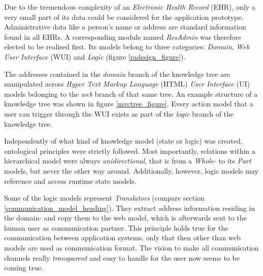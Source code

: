 Due to the tremendous complexity of an \emph{Electronic Health Record} (EHR),
only a very small part of its data could be considered for the application
prototype. Administrative data like a person's name or address are standard
information found in all EHRs. A corresponding module named \emph{ResAdmin}
\cite{holzmueller2005} was therefore elected to be realised first. Its models
belong to three categories: \emph{Domain}, \emph{Web User Interface} (WUI) and
\emph{Logic} (figure \ref{radesign_figure}).

The addresses contained in the \emph{domain} branch of the knowledge tree are
manipulated across \emph{Hyper Text Markup Language} (HTML) \emph{User Interface}
(UI) models belonging to the \emph{web} branch of that same tree. An example
structure of a knowledge tree was shown in figure \ref{mvctree_figure}. Every
action model that a user can trigger through the WUI exists as part of the
\emph{logic} branch of the knowledge tree.

Independently of what kind of knowledge model (state or logic) was created,
ontological principles were strictly followed. Most importantly, relations
within a hierarchical model were always \emph{unidirectional}, that is from a
\emph{Whole-} to its \emph{Part} models, but never the other way around.
Additionally, however, logic models may reference and access runtime state
models.

Some of the logic models represent \emph{Translators} (compare section
\ref{communication_model_heading}). They extract address information
residing in the domain- and copy them to the web model, which is afterwards
sent to the human user as communication partner. This principle holds true for
the communication between application systems, only that then other than web
models are used as communication format. The vision to make all communication
channels really \emph{transparent} and easy to handle for the user now seems to
be coming true.
